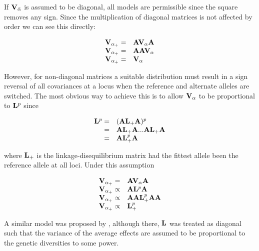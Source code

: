 \documentclass[12pt]{article}
\begin{document}
\begin{bibunit}
If ${\bf V}_{\bar{\alpha}}$ is assumed to be diagonal, all models are permissible since the square removes any sign. Since the multiplication of diagonal matrices is not affected by order we can see this directly:

\begin{equation}
\begin{array}{rl}
{\bf V}_{{\alpha}_{+}} =& {\bf A}{\bf V}_{{\alpha}}{\bf A}\\
{\bf V}_{{\alpha}_{+}} =& {\bf A}{\bf A}{\bf V}_{{\alpha}}\\
{\bf V}_{{\alpha}_{+}} =& {\bf V}_{{\alpha}}\\
\end{array}
\end{equation}

However, for non-diagonal matrices a suitable distribution must result in a sign reversal of all covariances at a locus when the reference and alternate alleles are switched. The most obvious way to achieve this is to allow ${\bf V}_{{\alpha}}$ to be proportional to ${\bf L}^{p}$ since

\begin{equation}
\begin{array}{rl}
{\bf L}^{p}=&({\bf A}{\bf L}_{+}{\bf A})^{p}\\
         =&{\bf A}{\bf L}_{+}{\bf A}...{\bf A}{\bf L}_{+}{\bf A}\\
         =&{\bf A}{\bf L}_{+}^p{\bf A}\\
\end{array}
\end{equation}

where ${\bf L}_{+}$ is the linkage-disequilibrium matrix had the fittest allele been the reference allele at all loci. Under this assumption

\begin{equation}
\begin{array}{rl}
{\bf V}_{{\alpha}_{+}} =& {\bf A}{\bf V}_{{\alpha}}{\bf A}\\
{\bf V}_{{\alpha}_{+}} \propto& {\bf A}{\bf L}^{p}{\bf A}\\
{\bf V}_{{\alpha}_{+}} \propto& {\bf A}{\bf A}{\bf L}_{+}^p{\bf A}{\bf A}\\
{\bf V}_{{\alpha}_{+}} \propto&{\bf L}_{+}^p\\
\end{array}
\end{equation}

A similar model was proposed by \citet{zeng2018signatures}, although there, ${\bf L}$ was treated as diagonal such that the variance of the average effects are assumed to be proportional to the genetic diversities to some power. 


\end{bibunit}
\end{document}
